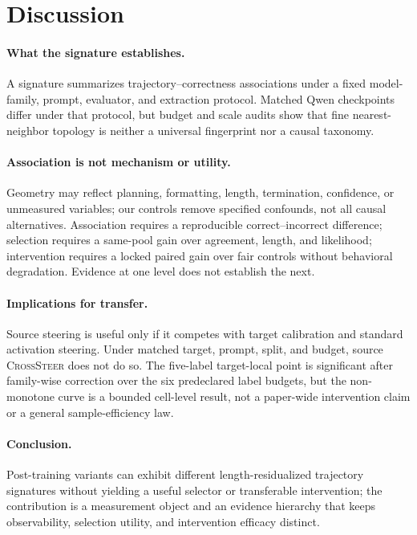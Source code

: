\section{Discussion}
\label{sec:discussion}

\paragraph{What the signature establishes.}
A signature summarizes trajectory--correctness associations under a fixed
model-family, prompt, evaluator, and extraction protocol. Matched Qwen
checkpoints differ under that protocol, but budget and scale audits show that
fine nearest-neighbor topology is neither a universal fingerprint nor a causal
taxonomy.

\paragraph{Association is not mechanism or utility.}
Geometry may reflect planning, formatting, length, termination, confidence, or
unmeasured variables; our controls remove specified confounds, not all causal
alternatives. Association requires a reproducible correct--incorrect difference;
selection requires a same-pool gain over agreement, length, and likelihood;
intervention requires a locked paired gain over fair controls without behavioral
degradation. Evidence at one level does not establish the next.

\paragraph{Implications for transfer.}
Source steering is useful only if it competes with target calibration and
standard activation steering. Under matched target, prompt, split, and budget,
source \textsc{CrossSteer} does not do so. The five-label target-local point is
significant after family-wise correction over the six predeclared label budgets,
but the non-monotone curve is a bounded cell-level result, not a paper-wide
intervention claim or a general sample-efficiency law.

\paragraph{Conclusion.}
Post-training variants can exhibit different length-residualized trajectory
signatures without yielding a useful selector or transferable intervention;
the contribution is a measurement object and an evidence hierarchy that
keeps observability, selection utility, and intervention efficacy distinct.
